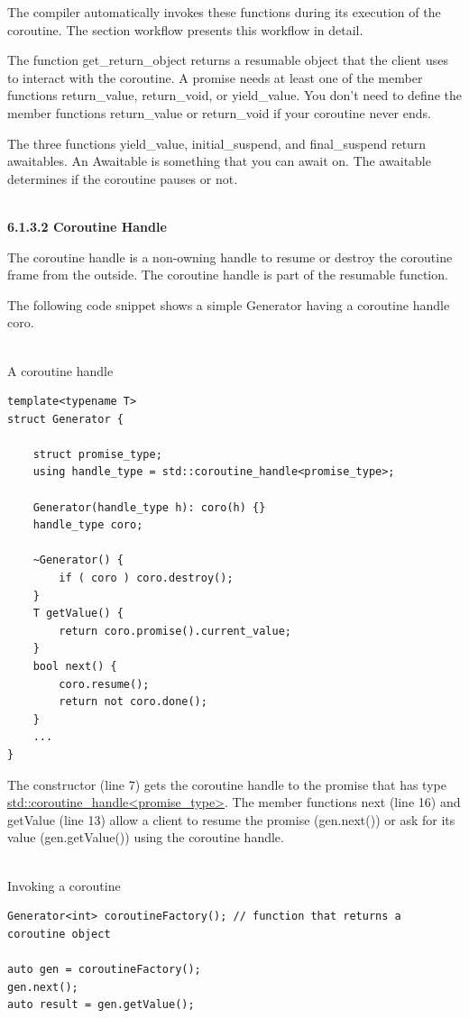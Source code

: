 The compiler automatically invokes these functions during its execution of the coroutine. The section workflow presents this workflow in detail.

The function get\_return\_object returns a resumable object that the client uses to interact with the coroutine. A promise needs at least one of the member functions return\_value, return\_void, or yield\_value. You don’t need to define the member functions return\_value or return\_void if your coroutine never ends.

The three functions yield\_value, initial\_suspend, and final\_suspend return awaitables. An Awaitable is something that you can await on. The awaitable determines if the coroutine pauses or not.

\hspace*{\fill} \\ %
\noindent
\textbf{6.1.3.2\hspace{0.2cm} Coroutine Handle}

The coroutine handle is a non-owning handle to resume or destroy the coroutine frame from the outside. The coroutine handle is part of the resumable function.

The following code snippet shows a simple Generator having a coroutine handle coro.

\hspace*{\fill} \\ %
\noindent
A coroutine handle
\begin{lstlisting}[style=styleCXX]
template<typename T>
struct Generator {

	struct promise_type;
	using handle_type = std::coroutine_handle<promise_type>;
	
	Generator(handle_type h): coro(h) {}
	handle_type coro;
	
	~Generator() {
		if ( coro ) coro.destroy();
	}
	T getValue() {
		return coro.promise().current_value;
	}
	bool next() {
		coro.resume();
		return not coro.done();
	}
	...
}
\end{lstlisting}

The constructor (line 7) gets the coroutine handle to the promise that has type \href{https://en.cppreference.com/w/cpp/coroutine/coroutine_handle}{std::coroutine\_handle<promise\_type>}. The member functions next (line 16) and getValue (line 13) allow a client to resume the promise (gen.next()) or ask for its value (gen.getValue()) using the coroutine handle.

\hspace*{\fill} \\ %
\noindent
Invoking a coroutine
\begin{lstlisting}[style=styleCXX]
Generator<int> coroutineFactory(); // function that returns a coroutine object

auto gen = coroutineFactory();
gen.next();
auto result = gen.getValue();
\end{lstlisting}


